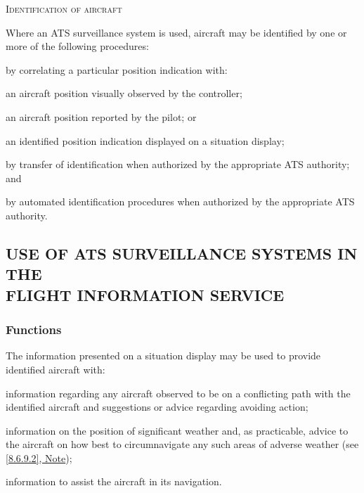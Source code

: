 \begin{enumeratesc}
    \item \textsc{Identification of aircraft}
    \begin{enumempty}
        \item Where an ATS surveillance system is used, aircraft may be identified by one or more of the following procedures:
    \end{enumempty}
    \begin{enumalph}
        \item by correlating a particular position indication with:     
        \begin{enumroman}
            \item an aircraft position visually observed by the controller;
            \item an aircraft position reported by the pilot; or
            \item an identified position indication displayed on a situation display;
        \end{enumroman}
        \item by transfer of identification when authorized by the appropriate ATS authority; and
        \item by automated identification procedures when authorized by the appropriate ATS authority.
    \end{enumalph}
\end{enumeratesc}

\subsection[Use of ATS surveillance systems in the flight information service]{USE OF ATS SURVEILLANCE SYSTEMS IN THE \\ FLIGHT INFORMATION SERVICE}


\subsubsection{Functions}

The information presented on a situation display may be used to provide identified aircraft with:
\begin{enumalph}
    \item information regarding any aircraft observed to be on a conflicting path with the identified aircraft and suggestions or advice regarding avoiding action;
    \item information on the position of significant weather and, as practicable, advice to the aircraft on how best to circumnavigate any such areas of adverse weather (see \hyperref[8.6.9.2]{\ref{8.6.9.2}, Note});
    \item information to assist the aircraft in its navigation.
\end{enumalph}

\chapterend